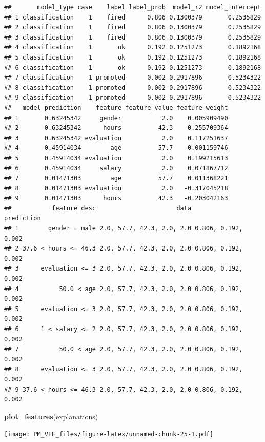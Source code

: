 \documentclass[]{krantz}
\newenvironment{Shaded}{\begin{snugshade}}{\end{snugshade}}
\newcommand{\KeywordTok}[1]{\textcolor[rgb]{0.13,0.29,0.53}{\textbf{#1}}}
\newcommand{\NormalTok}[1]{#1}
\theoremstyle{definition}
\theoremstyle{definition}
\theoremstyle{definition}
\theoremstyle{remark}
\begin{document}
\begin{verbatim}
##       model_type case    label label_prob  model_r2 model_intercept
## 1 classification    1    fired      0.806 0.1300379       0.2535829
## 2 classification    1    fired      0.806 0.1300379       0.2535829
## 3 classification    1    fired      0.806 0.1300379       0.2535829
## 4 classification    1       ok      0.192 0.1251273       0.1892168
## 5 classification    1       ok      0.192 0.1251273       0.1892168
## 6 classification    1       ok      0.192 0.1251273       0.1892168
## 7 classification    1 promoted      0.002 0.2917896       0.5234322
## 8 classification    1 promoted      0.002 0.2917896       0.5234322
## 9 classification    1 promoted      0.002 0.2917896       0.5234322
##   model_prediction    feature feature_value feature_weight
## 1       0.63245342     gender           2.0    0.005909490
## 2       0.63245342      hours          42.3    0.255709364
## 3       0.63245342 evaluation           2.0    0.117251637
## 4       0.45914034        age          57.7   -0.001159746
## 5       0.45914034 evaluation           2.0    0.199215613
## 6       0.45914034     salary           2.0    0.071867712
## 7       0.01471303        age          57.7    0.011368221
## 8       0.01471303 evaluation           2.0   -0.317045218
## 9       0.01471303      hours          42.3   -0.203042163
##           feature_desc                      data          prediction
## 1        gender = male 2.0, 57.7, 42.3, 2.0, 2.0 0.806, 0.192, 0.002
## 2 37.6 < hours <= 46.3 2.0, 57.7, 42.3, 2.0, 2.0 0.806, 0.192, 0.002
## 3      evaluation <= 3 2.0, 57.7, 42.3, 2.0, 2.0 0.806, 0.192, 0.002
## 4           50.0 < age 2.0, 57.7, 42.3, 2.0, 2.0 0.806, 0.192, 0.002
## 5      evaluation <= 3 2.0, 57.7, 42.3, 2.0, 2.0 0.806, 0.192, 0.002
## 6      1 < salary <= 2 2.0, 57.7, 42.3, 2.0, 2.0 0.806, 0.192, 0.002
## 7           50.0 < age 2.0, 57.7, 42.3, 2.0, 2.0 0.806, 0.192, 0.002
## 8      evaluation <= 3 2.0, 57.7, 42.3, 2.0, 2.0 0.806, 0.192, 0.002
## 9 37.6 < hours <= 46.3 2.0, 57.7, 42.3, 2.0, 2.0 0.806, 0.192, 0.002
\end{verbatim}

\begin{Shaded}
\begin{Highlighting}[]
\KeywordTok{plot_features}\NormalTok{(explanations)}
\end{Highlighting}
\end{Shaded}

\texttt{[image: PM\_VEE\_files/figure-latex/unnamed-chunk-25-1.pdf]}
\end{document}
